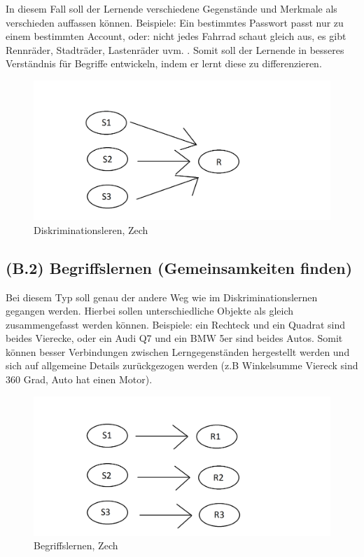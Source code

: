 In diesem Fall soll der Lernende verschiedene Gegenstände und Merkmale als verschieden auffassen können. Beispiele: Ein bestimmtes Passwort passt nur zu einem bestimmten Account, oder: nicht jedes Fahrrad schaut gleich aus, es gibt Rennräder, Stadträder, Lastenräder uvm.  . Somit soll der Lernende in besseres Verständnis für Begriffe entwickeln, indem er lernt diese zu differenzieren.

\begin{figure}[!ht]
\noindent\hspace{0.5mm}\includegraphics[width=12cm]{./Ressourcen/Diskrimination.png}
\caption{Diskriminationsleren, Zech}
\end{figure}

\subsection[]{(B.2) Begriffslernen (Gemeinsamkeiten finden)}

Bei diesem Typ soll genau der andere Weg wie im Diskriminationslernen gegangen werden. Hierbei sollen unterschiedliche Objekte als gleich zusammengefasst werden können. 
Beispiele: ein Rechteck und ein Quadrat sind beides Vierecke, oder ein Audi Q7 und ein BMW 5er sind beides Autos. Somit können besser Verbindungen zwischen Lerngegenständen hergestellt werden und sich auf allgemeine Details zurückgezogen werden (z.B Winkelsumme Viereck sind 360 Grad, Auto hat einen Motor).

\begin{figure}[!ht]
\noindent\hspace{0.5mm}\includegraphics[width=12cm]{./Ressourcen/Begriffslernen.png}
\caption{Begriffslernen, Zech}
\end{figure}


